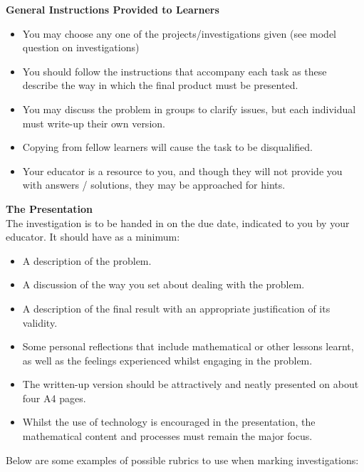 \textbf{General Instructions Provided to Learners}\\
\begin{itemize}[noitemsep]
\item You may choose any one of the projects/investigations given (see model question on investigations)
\item You should follow the instructions that accompany each task as these describe the way in which the final product must be presented.
\item You may discuss the problem in groups to clarify issues, but each individual must write-up their own version.
\item Copying from fellow learners will cause the task to be disqualified.
\item Your educator is a resource to you, and though they will not provide you with answers / solutions, they may be approached for hints.
	\end{itemize}	
\textbf{The Presentation}\\
The investigation is to be handed in on the due date, indicated to you by your educator. It should have as a minimum:
\begin{itemize}[noitemsep]
\item A description of the problem.
\item A discussion of the way you set about dealing with the problem.
\item A description of the final result with an appropriate justification of its validity.
\item Some personal reflections that include mathematical or other lessons learnt, as well as the feelings experienced whilst engaging in the problem.
\item The written-up version should be attractively and neatly presented on about four A4 pages.
\item Whilst the use of technology is encouraged in the presentation, the mathematical content and processes must remain the major focus.
\end{itemize}	
Below are some examples of possible rubrics to use when marking investigations:\par

